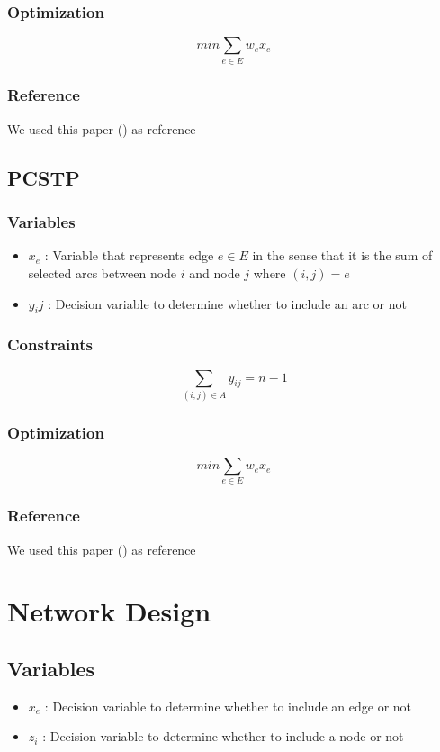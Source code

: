 \documentclass{article}
\begin{document}
\subsubsection{Optimization}
\[ min \sum_{e\in E}w_ex_e \]

\subsubsection{Reference}
We used this paper (\cite{solving_steiner_tree_problems}) as reference

\subsection{PCSTP}

\subsubsection{Variables}
\begin{itemize}
	\item $x_e$ : Variable that represents edge $e \in E$ in the sense that it is the sum of selected arcs between node $i$ and node $j$ where $(i,j) = e$ 
	\item $y_ij$ : Decision variable to determine whether to include an arc or not
\end{itemize}

\subsubsection{Constraints}
\[ \sum_{(i,j)\in A}y_{ij} = n-1 \]

\subsubsection{Optimization}
\[ min \sum_{e\in E}w_ex_e \]

\subsubsection{Reference}
We used this paper (\cite{prize_collecting_steiner_tree_problem}) as reference

\clearpage

\section{Network Design}

\subsection{Variables}
\begin{itemize}
	\item $x_e$ : Decision variable to determine whether to include an edge or not
	\item $z_i$ : Decision variable to determine whether to include a node or not
\end{itemize}
\end{document}
